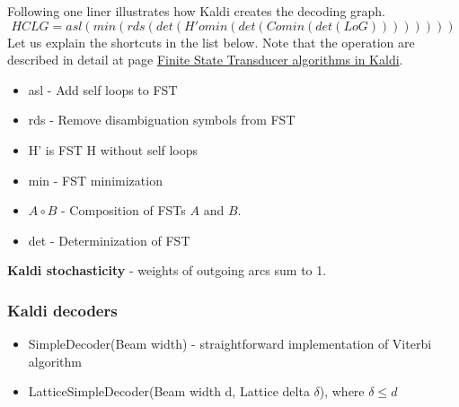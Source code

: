 Following one liner illustrates how Kaldi creates the decoding graph. 
\begin{equation}
   HCLG = asl(min(rds(det(H' o min(det(C o min(det(L o G)))))))) 
\end{equation}
Let us explain the shortcuts in the list below. Note that the operation are described in detail
at page \href{http://kaldi.sourceforge.net/fst_algo.html#fst_algo_stochastic} {Finite State Transducer algorithms in Kaldi}. 
\begin{itemize}
    \item asl - Add self loops to FST
    \item rds - Remove disambiguation symbols from FST
    \item H' is FST H without self loops
    \item min - FST minimization
    \item $A\circ B$  - Composition of FSTs $A$ and $B$.
    \item det - Determinization of FST
\end{itemize}

{\bf Kaldi stochasticity} - weights of outgoing arcs sum to 1.


\subsubsection*{Kaldi decoders} %
\begin{itemize}
    \item SimpleDecoder(Beam width) - straightforward implementation of Viterbi algorithm
    \item LatticeSimpleDecoder(Beam width d, Lattice delta $\delta$), where $ \delta \le d$

\end{itemize}



